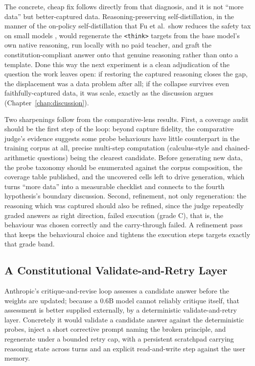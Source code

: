 The concrete, cheap fix follows directly from that diagnosis, and it is not ``more data'' but better-captured data. Reasoning-preserving self-distillation, in the manner of the on-policy self-distillation that Fu et al.\ show reduces the safety tax on small models \cite{fu2026reducingsafetytaxllm}, would regenerate the \texttt{<think>} targets from the base model's own native reasoning, run locally with no paid teacher, and graft the constitution-compliant answer onto that genuine reasoning rather than onto a template. Done this way the next experiment is a clean adjudication of the question the work leaves open: if restoring the captured reasoning closes the gap, the displacement was a data problem after all; if the collapse survives even faithfully-captured data, it was scale, exactly as the discussion argues (Chapter~\ref{chap:discussion}).

Two sharpenings follow from the comparative-lens results. First, a coverage audit should be the first step of the loop: beyond capture fidelity, the comparative judge's evidence suggests some probe behaviours have little counterpart in the training corpus at all, precise multi-step computation (calculus-style and chained-arithmetic questions) being the clearest candidate. Before generating new data, the probe taxonomy should be enumerated against the corpus composition, the coverage table published, and the uncovered cells left to drive generation, which turns ``more data'' into a measurable checklist and connects to the fourth hypothesis's boundary discussion. Second, refinement, not only regeneration: the reasoning which was captured should also be refined, since the judge repeatedly graded answers as right direction, failed execution (grade C), that is, the behaviour was chosen correctly and the carry-through failed. A refinement pass that keeps the behavioural choice and tightens the execution steps targets exactly that grade band.

\subsection{A Constitutional Validate-and-Retry Layer}
\label{subsec:conclusion-future-validate-retry}

Anthropic's critique-and-revise loop \cite{bai2022constitutionalaiharmlessnessai} assesses a candidate answer before the weights are updated; because a 0.6B model cannot reliably critique itself, that assessment is better supplied externally, by a deterministic validate-and-retry layer. Concretely it would validate a candidate answer against the deterministic probes, inject a short corrective prompt naming the broken principle, and regenerate under a bounded retry cap, with a persistent scratchpad carrying reasoning state across turns and an explicit read-and-write step against the user memory.

